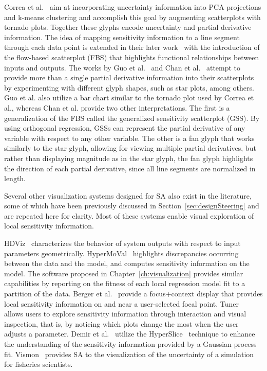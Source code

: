Correa et al.~\cite{CorreaChanMa2009} aim at incorporating uncertainty information into PCA projections and k-means clustering and accomplish this goal by augmenting scatterplots with tornado plots.
%
Together these glyphs encode uncertainty and partial derivative information.
%
The idea of mapping sensitivity information to a line segment through each data point is extended in their later work~\cite{ChanCorreaMa2010} with the introduction of the flow-based scatterplot (FBS) that highlights functional relationships between inputs and outputs.
%
The works by Guo et al.~\cite{GuoWardRundensteiner2011} and Chan et al.~\cite{ChanCorreaMa2013} attempt to provide more than a single partial derivative information into their scatterplots by experimenting with different glyph shapes, such as star plots, among others.
%
Guo et al. also utilize a bar chart similar to the tornado plot used by Correa et al., whereas Chan et al. provide two other interpretations.
%
The first is a generalization of the FBS called the generalized sensitivity scatterplot (GSS).
%
By using orthogonal regression, GSSs can represent the partial derivative of any variable with respect to any other variable.
%
The other is a fan glyph that works similarly to the star glyph, allowing for viewing multiple partial derivatives, but rather than displaying magnitude as in the star glyph, the fan glyph highlights the direction of each partial derivative, since all line segments are normalized in length.

Several other visualization systems designed for SA also exist in the literature, some of which have been previously discussed in Section~\ref{sec:designSteering} and are repeated here for clarity.
%
Most of these systems enable visual exploration of local sensitivity information.

HDViz~\cite{GerberBremerPascucci2010} characterizes the behavior of system outputs with respect to input parameters geometrically.
%
HyperMoVal~\cite{PiringerBergerKrasser2010} highlights discrepancies occurring between the data and the model, and computes sensitivity information on the model.
%
The software proposed in Chapter~\ref{ch:visualization} provides similar capabilities by reporting on the fitness of each local regression model fit to a partition of the data.
%
Berger et al.~\cite{BergerPiringerFilzmoser2011} provide a focus+context display that provides local sensitivity information on and near a user-selected focal point.
%
Tuner~\cite{Torsney-WeirSaadMoller2011} allows users to explore sensitivity information through interaction and visual inspection, that is, by noticing which plots change the most when the user adjusts a parameter.
%
Demir et al.~\cite{DemirWestermann2013} utilize the HyperSlice~\cite{VanWijkVanLiere1993} technique to enhance the understanding of the sensitivity information provided by a Gaussian process fit.
%
Vismon~\cite{BooshehrianMullrPeterman2012} provides SA to the visualization of the uncertainty of a simulation for fisheries scientists.

